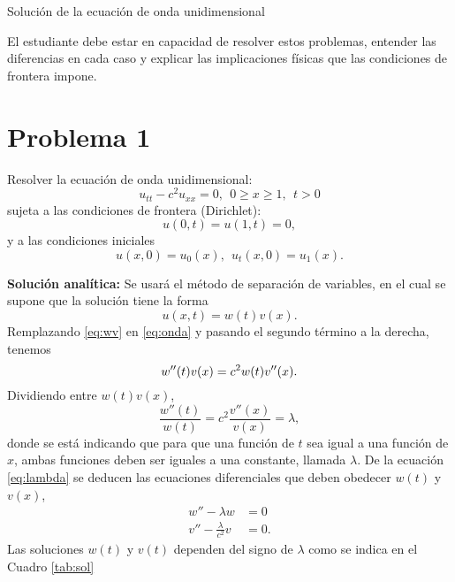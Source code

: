 \documentclass[11pt]{article}
\begin{document}
\begin{center}
{\Large Soluci\'on de la ecuaci\'on de onda unidimensional}
\end{center}

El estudiante debe estar en capacidad de resolver estos problemas, entender
las diferencias en cada caso y explicar las implicaciones f\'isicas que las condiciones
de frontera impone.

\section*{Problema 1}
\noindent Resolver la ecuaci\'on de onda unidimensional:
\begin{equation}
  \label{eq:onda}
  u_{tt} - c^2 u_{xx} = 0,~~0 \ge x \ge 1,~~t>0
\end{equation}
sujeta a las condiciones de frontera (Dirichlet):
\begin{equation}
  \label{eq:dirich}
  u(0,t) = u(1,t) = 0,
\end{equation}
y a las condiciones iniciales
\begin{equation}
  \label{eq:6}
  u(x,0) = u_0(x),~~u_t(x,0)=u_1(x).
\end{equation}

{\bf Soluci\'on anal\'itica:} Se usar\'a el m\'etodo de separaci\'on de variables, en el cual se supone que la soluci\'on tiene la forma
\begin{equation}
  \label{eq:wv}
  u(x,t) = w(t)v(x).
\end{equation}
Remplazando \eqref{eq:wv} en \eqref{eq:onda} y pasando el segundo t\'ermino a la derecha, tenemos
\begin{equation}
  w''(t)v(x) = c^2w(t)v''(x). \\
\end{equation}
Dividiendo entre $w(t)v(x)$,
\begin{equation}
  \label{eq:lambda}
    \frac{w''(t)}{w(t)} = c^2\frac{v''(x)}{v(x)} = \lambda,
\end{equation}
donde se est\'a  indicando que para que una funci\'on de $t$ sea igual a una funci\'on de $x$, ambas funciones deben ser iguales a una constante, llamada $\lambda$. De la ecuaci\'on \eqref{eq:lambda} se deducen las ecuaciones diferenciales que deben obedecer $w(t)$ y $v(x)$,
\begin{eqnarray}
  \label{eq:4}
  w'' - \lambda w  &= 0 \\
  v'' - \frac{\lambda}{c^2}v &= 0.
\end{eqnarray}
Las soluciones $w(t)$ y $v(t)$ dependen del signo de $\lambda$ como se indica en el Cuadro \ref{tab:sol}
\end{document}
